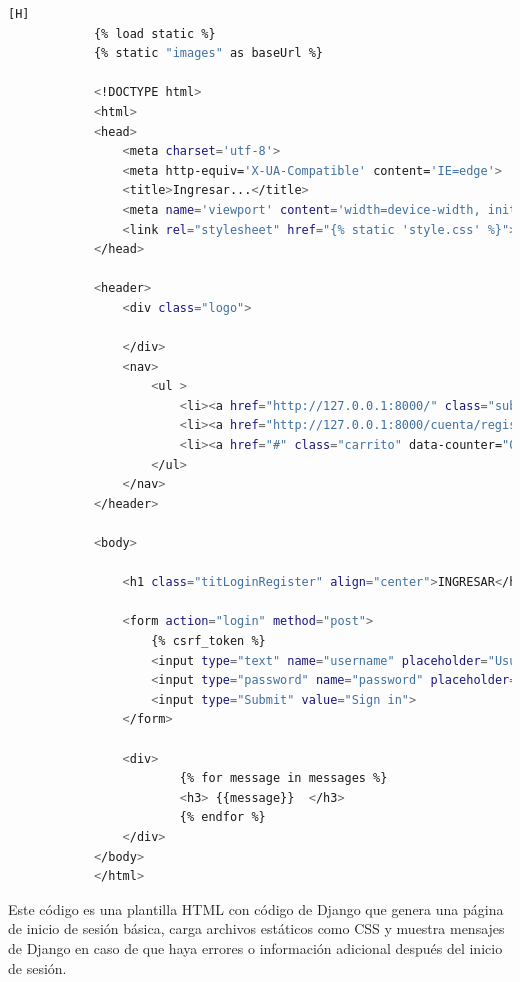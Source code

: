 \documentclass{article}
\begin{document}
         \begin{lstlisting}[language=bash,caption={login.html}][H]
            {% load static %}
            {% static "images" as baseUrl %}
            
            <!DOCTYPE html>
            <html>
            <head>
                <meta charset='utf-8'>
                <meta http-equiv='X-UA-Compatible' content='IE=edge'>
                <title>Ingresar...</title>
                <meta name='viewport' content='width=device-width, initial-scale=1'>
                <link rel="stylesheet" href="{% static 'style.css' %}">
            </head>
            
            <header>
                <div class="logo">
                    
                </div>
                <nav>
                    <ul >
                        <li><a href="http://127.0.0.1:8000/" class="sub">Pagina Principal</a></li>
                        <li><a href="http://127.0.0.1:8000/cuenta/register" class="sub">Registrarse</a></li>
                        <li><a href="#" class="carrito" data-counter="0">&#128722;</a></li>
                    </ul>
                </nav>
            </header>
            
            <body>
            
                <h1 class="titLoginRegister" align="center">INGRESAR</h1>
            
                <form action="login" method="post">
                    {% csrf_token %}
                    <input type="text" name="username" placeholder="Usuario"><br>
                    <input type="password" name="password" placeholder="Contraseña"><br>
                    <input type="Submit" value="Sign in">
                </form>
            
                <div>
                        {% for message in messages %}
                        <h3> {{message}}  </h3>
                        {% endfor %}
                </div>
            </body>
            </html>
	\end{lstlisting}
        Este código es una plantilla HTML con código de Django que genera una página de inicio de sesión básica, carga archivos estáticos como CSS y muestra mensajes de Django en caso de que haya errores o información adicional después del inicio de sesión.
\end{document}
